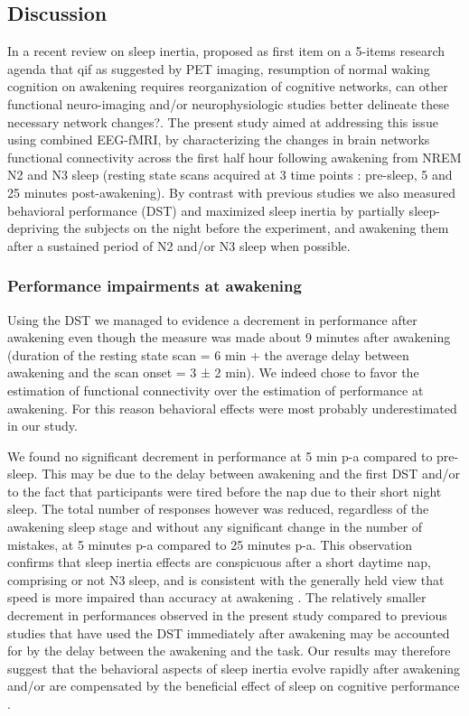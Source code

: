 \FloatBarrier

\subsection*{Discussion}
\label{res:inertia:inertia:discussion}

In a recent review on sleep inertia, \citet{trotti_waking_2016} proposed as first item on a 5-items research agenda that q{if as suggested by PET imaging, resumption of normal waking cognition on awakening requires reorganization of cognitive networks, can other functional neuro-imaging and/or neurophysiologic studies better delineate these necessary network changes?}. The present study aimed at addressing this issue using combined EEG-fMRI, by characterizing the changes in brain networks functional connectivity across the first half hour following awakening from NREM N2 and N3 sleep (resting state scans acquired at 3 time points : pre-sleep, 5 and 25 minutes post-awakening). By contrast with previous studies we also measured behavioral performance (DST) and maximized sleep inertia by partially sleep-depriving the subjects on the night before the experiment, and awakening them after a sustained period of N2 and/or N3 sleep when possible.

\subsubsection*{Performance impairments at awakening}
Using the DST we managed to evidence a decrement in performance after awakening even though the measure was made about 9 minutes after awakening (duration of the resting state scan = 6 min + the average delay between awakening and the scan onset = 3 ± 2 min). We indeed chose to favor the estimation of functional connectivity over the estimation of performance at awakening. For this reason behavioral effects were most probably underestimated in our study.

We found no significant decrement in performance at 5 min p-a compared to pre-sleep. This may be due to the delay between awakening and the first DST and/or to the fact that participants were tired before the nap due to their short night sleep. The total number of responses however was reduced, regardless of the awakening sleep stage and without any significant change in the number of mistakes, at 5 minutes p-a compared to 25 minutes p-a. This observation confirms that sleep inertia effects are conspicuous after a short daytime nap, comprising or not N3 sleep, and is consistent with the generally held view that speed is more impaired than accuracy at awakening \citep{tassi_sleep_2000, trotti_waking_2016}. The relatively smaller decrement in performances observed in the present study compared to previous studies that have used the DST immediately after awakening \citep{dinges_assessing_1985, evans_recovery_1975, stampi_ultrashort_1990} may be accounted for by the delay between the awakening and the task. Our results may therefore suggest that the behavioral aspects of sleep inertia evolve rapidly after awakening and/or are compensated by the beneficial effect of sleep on cognitive performance \citep{faraut_napping:_2016}.


